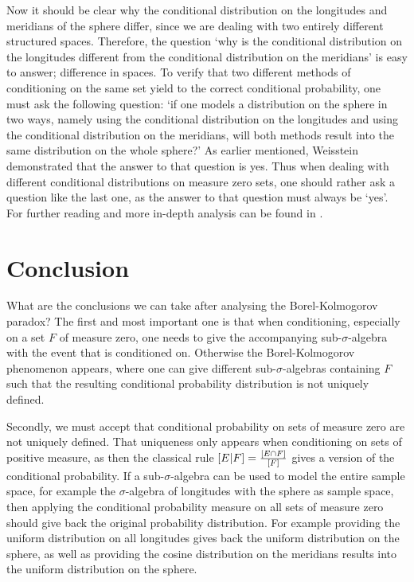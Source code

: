 \documentclass[twoside,a4paper]{report}
\theoremstyle{plain}
\theoremstyle{definition}
\theoremstyle{remark}
\numberwithin{equation}{chapter}
\let\P\relax
\DeclareMathOperator{\P}{\mathbb{P}}
\DeclareMathOperator{\1}{\mathbbm{1}}
\begin{document}
Now it should be clear why the conditional distribution on the longitudes and meridians of the sphere differ, since we are dealing with two entirely different structured spaces. Therefore, the question `why is the conditional distribution on the longitudes different from the conditional distribution on the meridians' is easy to answer; difference in spaces. To verify that two different methods of conditioning on the same set yield to the correct conditional probability, one must ask the following question: `if one models a distribution on the sphere in two ways, namely using the conditional distribution on the longitudes and using the conditional distribution on the meridians, will both methods result into the same distribution on the whole sphere?' As earlier mentioned, Weisstein \cite{Weisstein} demonstrated that the answer to that question is yes. Thus when dealing with different conditional distributions on measure zero sets, one should rather ask a question like the last one, as the answer to that question must always be `yes'. For further reading and more in-depth analysis can be found in \cite{Gyenis17}.


\section{Conclusion}
What are the conclusions we can take after analysing the Borel-Kolmogorov paradox? The first and most important one is that when conditioning, especially on a set $F$ of measure zero, one needs to give the accompanying sub-$\sigma$-algebra with the event that is conditioned on. Otherwise the Borel-Kolmogorov phenomenon appears, where one can give different sub-$\sigma$-algebras containing $F$ such that the resulting conditional probability distribution is not uniquely defined.

Secondly, we must accept that conditional probability on sets of measure zero are not uniquely defined. That uniqueness only appears when conditioning on sets of positive measure, as then the classical rule $\P[E|F]=\frac{\P[E\cap F]}{\P[F]}$ gives a version of the conditional probability. If a sub-$\sigma$-algebra can be used to model the entire sample space, for example the $\sigma$-algebra of longitudes with the sphere as sample space, then applying the conditional probability measure on all sets of measure zero should give back the original probability distribution. For example providing the uniform distribution on all longitudes gives back the uniform distribution on the sphere, as well as providing the cosine distribution on the meridians results into the uniform distribution on the sphere.
\end{document}
